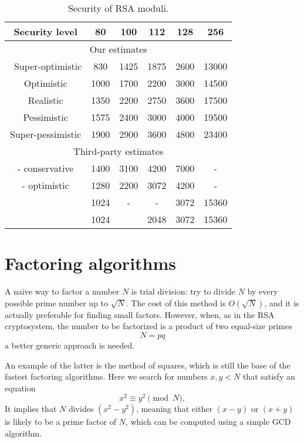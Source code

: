 \documentclass[a4paper]{article}
\begin{document}
\begin{table}[t]
    \centering
    \begin{tabular}{|c|c|c|c|c|c|}
        \hline 
        Security level &80 & 100 & 112 & 128 & 256   \\
        \hline\hline
        \multicolumn{6}{|c|}{Our estimates}\\\hline\
        Super-optimistic & 830 & 1425 & 1875 & 2600 &13000\\
        Optimistic& 1000 & 1700 & 2200 & 3000 & 14500\\
        Realistic & 1350 &2200 & 2750& 3600 & 17500\\
        Pessimistic & 1575 & 2400&3000& 4000 & 19500\\
        Super-pessimistic& 1900 & 2900 &3600& 4800 & 23400\\         \hline\hline
        \multicolumn{6}{|c|}{Third-party estimates}\\\hline
        \cite{lenstra2004key} - conservative & 1400 & 3100 & 4200 & 7000&-\\
        \cite{lenstra2004key} - optimistic & 1280 & 2200 & 3072 & 4200&-\\
        \cite{abdalla2016algorithms} & 1024 &-&-&3072 & 15360\\
        \cite{barker2016nist}&1024 &&2048&3072 &15360\\\hline
    \end{tabular}
    \caption{Security of RSA moduli.}
    \label{tab:sec}
\end{table}


\section{Factoring algorithms}

A naive way to factor a number $N$ is trial division: try to divide $N$ by every possible prime number up to $\sqrt{N}$. The cost of this method is $O(\sqrt{N})$, and it is actually preferable for finding small factors. However, when, as in the RSA cryptosystem, the number to be factorized is a product of two equal-size primes
$$
N = pq
$$
a better generic approach is needed.

An example of the latter is the method of squares, which is still the base of the fastest factoring algorithms. Here we search for numbers $x,y <N$ that satisfy an equation
\begin{equation}\label{eq:square}
x^2 \equiv y^2 \pmod{N},
\end{equation}
It implies that $N$ divides $(x^2-y^2)$, meaning that  either $(x-y)$ or $(x+y)$ is likely to be a prime factor of $N$, which can be computed using a simple GCD algorithm. 
\end{document}
